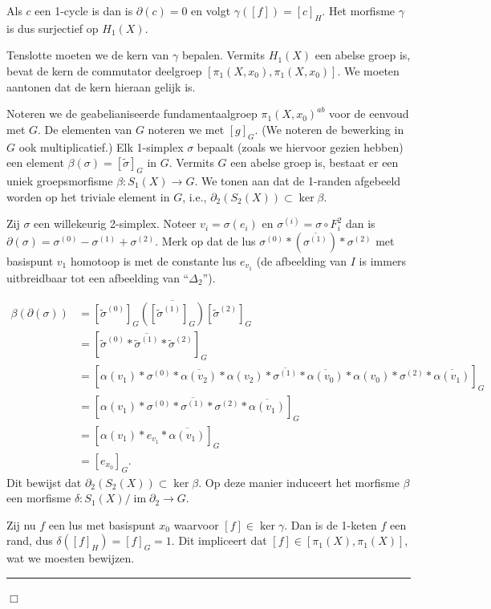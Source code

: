 \documentclass[12pt]{book}
\DeclareMathOperator{\Ima}{im}
\newcommand{\B}{\rule{1mm}{0mm} \hfill $\Box$ }
\begin{document}
Als $c$ een 1-cycle is dan is $\partial(c)=0$ en volgt
$\gamma([f])=[c]_H$. Het morfisme $\gamma$ is dus surjectief op $H_1(X)$.

Tenslotte moeten we de kern van $\gamma$ bepalen. Vermits $H_{1}(X)$ een abelse groep is, bevat de kern de commutator deelgroep $[\pi_1(X,x_0), \pi_1(X,x_0)]$. We moeten aantonen dat de kern hieraan gelijk is.

Noteren we de geabelianiseerde fundamentaalgroep $\pi_1(X,x_0)^{ab}$ voor de eenvoud met $G$. De elementen van $G$ noteren we met $[g]_G$. (We noteren de bewerking in $G$ ook multiplicatief.) Elk 1-simplex $\sigma$ bepaalt (zoals we hiervoor gezien hebben) een element $\beta(\sigma)=[\tilde{\sigma}]_G$ in $G$. Vermits $G$ een abelse groep is, bestaat er een uniek groepsmorfisme $\beta: S_{1}(X)\to G$. We tonen aan dat de 1-randen afgebeeld worden op het triviale element in $G$, i.e., $\partial_2(S_2(X))\subset \ker \beta$.

Zij $\sigma$ een willekeurig 2-simplex. Noteer $v_i=\sigma(e_i)$ en $\sigma^{(i)}=\sigma \circ F_{i}^{2}$ dan is
$\partial (\sigma)= \sigma^{(0)}-\sigma^{(1)}+\sigma^{(2)}$.  Merk op dat de lus  $\sigma^{(0)}* (\overline{\sigma^{(1)}})*\sigma^{(2)}$ met basispunt $v_1$ homotoop is met de constante lus $e_{v_{1}}$ (de afbeelding van $I$ is immers uitbreidbaar tot een afbeelding van ``$\Delta_2$'').

\begin{align*}
\beta(\partial(\sigma)) & =  [\tilde{\sigma}^{(0)}]_G \overline{([\tilde{\sigma}^{(1)}]_G)} [\tilde{\sigma}^{(2)}]_G\\
& =  [\tilde{\sigma}^{(0)}*\overline{\tilde{\sigma}^{(1)}}* \tilde{\sigma}^{(2)}]_G\\
& =  [\alpha(v_1)*\sigma^{(0)}*\overline{\alpha(v_2)}*\alpha(v_2)*\overline{\sigma^{(1)}}*\overline{\alpha(v_0)}*\alpha(v_0)*\sigma^{(2)}*\overline{\alpha(v_1)}]_G\\
& =  [\alpha(v_1)*\sigma^{(0)}*\overline{\sigma^{(1)}}*\sigma^{(2)}*\overline{\alpha(v_1)}]_G\\
& = [\alpha(v_1)*e_{v_{1}}*\overline{\alpha(v_1)}]_G\\
& = [e_{x_{0}}]_G. \end{align*}
Dit bewijst dat $\partial_2(S_{2}(X))\subset \ker \beta$. Op deze manier induceert het morfisme $\beta$ een morfisme $\delta: S_1(X) / \Ima \partial_2 \to G$. 

Zij nu $f$ een lus met basispunt $x_0$ waarvoor $[f]\in \ker \gamma$. Dan is de 1-keten $f$ een rand, dus $\delta([f]_H)=[f]_G=1$. Dit impliceert dat $[f]\in [\pi_{1}(X), \pi_{1}(X)]$, wat we moesten bewijzen. \B
\end{document}
